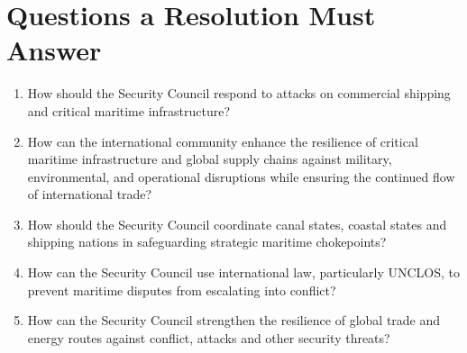 \section{Questions a Resolution Must Answer}

\begin{enumerate}
  \item How should the Security Council respond to attacks on commercial shipping and critical maritime infrastructure?
  \item How can the international community enhance the resilience of critical maritime infrastructure and global supply chains against military, environmental, and operational disruptions while ensuring the continued flow of international trade?
  \item How should the Security Council coordinate canal states, coastal states and shipping nations in safeguarding strategic maritime chokepoints?
  \item How can the Security Council use international law, particularly UNCLOS, to prevent maritime disputes from escalating into conflict?
  \item How can the Security Council strengthen the resilience of global trade and energy routes against conflict, attacks and other security threats?
\end{enumerate}
